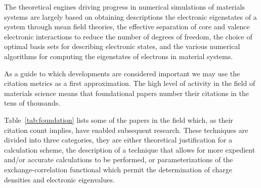 The theoretical engines driving progress in numerical simulations of materials systems are
largely based on obtaining descriptions the electronic eigenstates 
of a system through mean field theories, the effective separation of core and 
valence electronic interactions to reduce the number of degrees of freedom, 
the choice of optimal basis sets for describing electronic states, 
and the various numerical algorithms for 
computing the eigenstates of electrons in material systems.

As a guide to which developments are considered important we may
use the citation metrics as a first approximation. The high level of 
activity in the field of materials science 
means that foundational papers number their citations in the tens of thousands. 

Table~\ref{tab:foundation} lists some of the papers in the field which, as
their citation count implies, have enabled subsequent research. 
These techniques are divided into three categories, 
they are either theoretical justification for a calculation scheme, the description of
a technique that allows for more expedient and/or accurate calculations to be performed, 
or parameterizations of the exchange-correlation functional which permit the determination
of charge densities and electronic eigenvalues.

\begin{table}
\caption{Citations are relevant up to Nov. 2017. Citations are according 
to the journals in which they appear. 
The actual number of citations are much higher. 
\label{tab:theoreticalpapers}}
\end{table}

